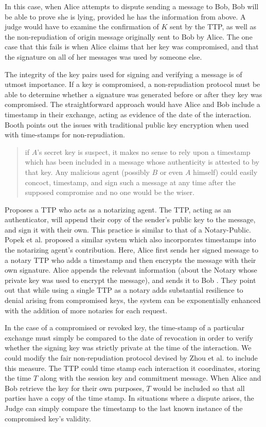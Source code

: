 \documentclass[12pt]{article}
\begin{document}
			In this case, when Alice attempts to dispute sending a message to Bob, Bob will be able to prove she is lying, provided he has the information from above. A judge would have to examine the confirmation of $K$ sent by the TTP, as well as the non-repudiation of origin message originally sent to Bob by Alice. The one case that this fails is when Alice claims that her key was compromised, and that the signature on all of her messages was used by someone else\cite{zhou1996fair}.

			The integrity of the key pairs used for signing and verifying a message is of utmost importance. If a key is compromised, a non-repudiation protocol must be able to determine whether a signature was generated before or after they key was compromised. The straightforward approach would have Alice and Bob include a timestamp in their exchange, acting as evidence of the date of the interaction. Booth points out the issues with traditional public key encryption when used with time-stamps for non-repudiation.
			\begin{quote}
				if $A$'s secret key is suspect, it makes no sense to rely upon a timestamp which has been included in a message whose authenticity is attested to by that key. Any malicious agent (possibly $B$ or even $A$ himself) could easily concoct, timestamp, and sign such a message at any time after the supposed compromise and no one would be the wiser.\cite{booth1981authentication}
			\end{quote}

			\cite{booth1981authentication} Proposes a TTP who acts as a notarizing agent. The TTP, acting as an authenticator, will append their copy of the sender's public key to the message, and sign it with their own. This practice is similar to that of a Notary-Public. Popek et al. proposed a similar system which also incorporates timestamps into the notarizing agent's contribution. Here, Alice first sends her signed message to a notary TTP who adds a timestamp and then encrypts the message with their own signature. Alice appends the relevant information (about the Notary whose private key was used to encrypt the message), and sends it to Bob \cite{kline1899public}. They point out that while using a single TTP as a notary adds substantial resilience to denial arising from compromised keys, the system can be exponentially enhanced with the addition of more notaries for each request.

			In the case of a compromised or revoked key, the time-stamp of a particular exchange must simply be compared to the date of revocation in order to verify whether the signing key was strictly private at the time of the interaction. We could modify the fair non-repudiation protocol devised by Zhou et al. to include this measure. The TTP could time stamp each interaction it coordinates, storing the time $T$ along with the session key and commitment message. When Alice and Bob retrieve the key for their own purposes, $T$ would be included so that all parties have a copy of the time stamp. In situations where a dispute arises, the Judge can simply compare the timestamp to the last known instance of the compromised key's validity.
\end{document}

